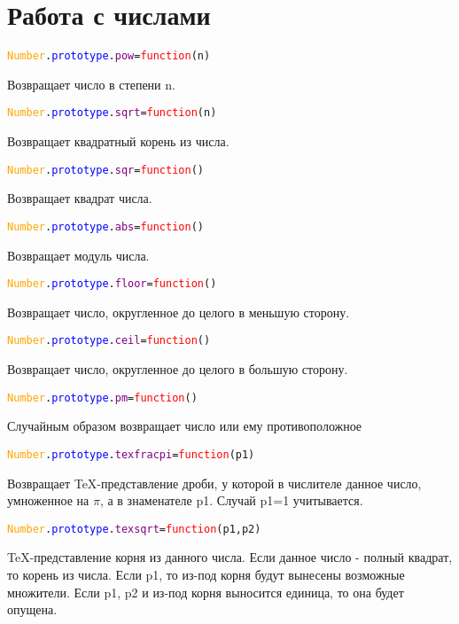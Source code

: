 \documentclass[a4paper,12pt]{article}
\begin{document}
	\section{Работа с числами}
	\begin{alltt}
		\textcolor{Orange}{Number}.\textcolor{Blue}{prototype}.\textcolor{Purple}{pow}=\textcolor{Red}{function}(n)
	\end{alltt}
	Возвращает число в степени n.
	\begin{alltt}
		\textcolor{Orange}{Number}.\textcolor{Blue}{prototype}.\textcolor{Purple}{sqrt}=\textcolor{Red}{function}(n)
	\end{alltt}
	Возвращает квадратный корень из числа.
	\begin{alltt}
		\textcolor{Orange}{Number}.\textcolor{Blue}{prototype}.\textcolor{Purple}{sqr}=\textcolor{Red}{function}()
	\end{alltt}
	Возвращает квадрат числа.
	\begin{alltt}
		\textcolor{Orange}{Number}.\textcolor{Blue}{prototype}.\textcolor{Purple}{abs}=\textcolor{Red}{function}()
	\end{alltt}
	Возвращает модуль числа.
	\begin{alltt}
		\textcolor{Orange}{Number}.\textcolor{Blue}{prototype}.\textcolor{Purple}{floor}=\textcolor{Red}{function}()
	\end{alltt}
	Возвращает число, округленное до целого в меньшую сторону.
	\begin{alltt}
		\textcolor{Orange}{Number}.\textcolor{Blue}{prototype}.\textcolor{Purple}{ceil}=\textcolor{Red}{function}()
	\end{alltt}
		Возвращает число, округленное до целого в большую сторону.
	\begin{alltt}
		\textcolor{Orange}{Number}.\textcolor{Blue}{prototype}.\textcolor{Purple}{pm}=\textcolor{Red}{function}()
	\end{alltt}
	Случайным образом возвращает число или ему противоположное
	\begin{alltt}
	\textcolor{Orange}{Number}.\textcolor{Blue}{prototype}.\textcolor{Purple}{texfracpi}=\textcolor{Red}{function}(p1)
	\end{alltt}
	Возвращает TeX-представление дроби, у которой в числителе данное число, умноженное на $\pi$, а в знаменателе p1.
	Случай p1=1 учитывается.
	\begin{alltt}
		\textcolor{Orange}{Number}.\textcolor{Blue}{prototype}.\textcolor{Purple}{texsqrt}=\textcolor{Red}{function}(p1,p2)
	\end{alltt}	
	TeX-представление корня из данного числа.
	Если данное число - полный квадрат, то корень из числа.
	Если p1, то из-под корня будут вынесены возможные множители.
	Если p1, p2 и из-под корня выносится единица, то она будет опущена.
\end{document}
